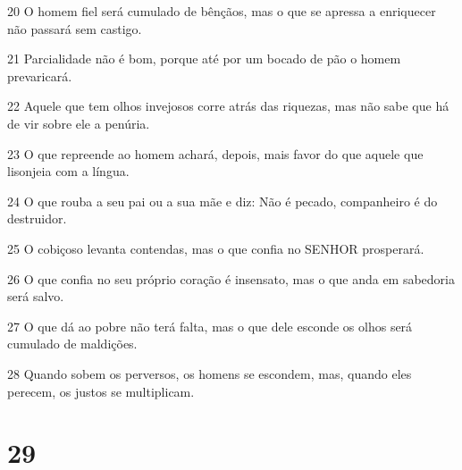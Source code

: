 \par 20 O homem fiel será cumulado de bênçãos, mas o que se apressa a enriquecer não passará sem castigo.
\par 21 Parcialidade não é bom, porque até por um bocado de pão o homem prevaricará.
\par 22 Aquele que tem olhos invejosos corre atrás das riquezas, mas não sabe que há de vir sobre ele a penúria.
\par 23 O que repreende ao homem achará, depois, mais favor do que aquele que lisonjeia com a língua.
\par 24 O que rouba a seu pai ou a sua mãe e diz: Não é pecado, companheiro é do destruidor.
\par 25 O cobiçoso levanta contendas, mas o que confia no SENHOR prosperará.
\par 26 O que confia no seu próprio coração é insensato, mas o que anda em sabedoria será salvo.
\par 27 O que dá ao pobre não terá falta, mas o que dele esconde os olhos será cumulado de maldições.
\par 28 Quando sobem os perversos, os homens se escondem, mas, quando eles perecem, os justos se multiplicam.

\chapter{29}

